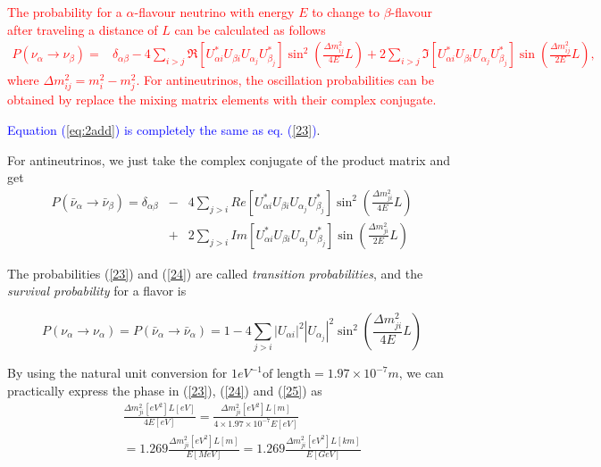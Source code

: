 \documentclass[a4 paper,12pt]{report}%
\begin{document}
\textcolor{red}{The probability for a $\alpha$-flavour neutrino with energy $E$ to change to $\beta$-flavour after traveling a distance of $L$ can be calculated as follows 
 \begin{align}\label{eq:2add}
 P(\nu_\alpha \rightarrow \nu_\beta) =& \delta_{\alpha \beta}-4\sum_{i>j}\Re\left[U^*_{\alpha i}U_{\beta i}U_{\alpha_j}U^*_{\beta_j}\right]\sin^2\left(\frac{\Delta m^2_{ij}}{4E}L\right) + 2\sum_{i>j}\Im\left[U^*_{\alpha i}U_{\beta i}U_{\alpha_j}U^*_{\beta_j}\right]\sin\left(\frac{\Delta m^2_{ij}}{2E}L\right),
 \end{align}
where $\Delta m^2_{ij} = m^2_{i} - m^2_{j}$. For antineutrinos, the oscillation probabilities can be obtained by replace the mixing matrix elements with their complex conjugate.}\par 
\textcolor{blue}{Equation (\ref{eq:2add}) is completely the same as eq. (\ref{23})}.\par 
For antineutrinos, we just take the complex conjugate of the product matrix and get
   \begin{eqnarray}\label{24}
 P(\bar\nu_\alpha \rightarrow \bar\nu_\beta) =\delta_{\alpha\beta}&-& 4\sum_{j>i}Re\left[U^*_{\alpha i}U_{\beta i}U_{\alpha_j}U^*_{\beta_j}\right]\sin^2(\frac{\Delta m^2_{ji}}{4E}L) \nonumber\\
&+& 2\sum_{j>i}Im\left[U^*_{\alpha i}U_{\beta i}U_{\alpha_j}U^*_{\beta_j}\right]\sin(\frac{\Delta m^2_{ji}}{2E}L)
   \end{eqnarray} \par
The probabilities (\ref{23}) and (\ref{24}) are called \textit{transition probabilities}, and the \textit{survival probability} for a flavor is
 
   \begin{equation}\label{25}
 P(\nu_\alpha \rightarrow \nu_\alpha) = P(\bar\nu_\alpha \rightarrow \bar\nu_\alpha) =1- 4\sum_{j>i}|U_{\alpha i}|^2|U_{\alpha_j}|^2\sin^2(\frac{\Delta m^2_{ji}}{4E}L)
   \end{equation} \par

By using the natural unit conversion for $1eV^{-1}\text{of length} = 1.97 \times 10^{-7}m$, we can practically express the phase in (\ref{23}), (\ref{24}) and (\ref{25}) as
   \begin{eqnarray}\label{26}
&& \frac{\Delta m^2_{ji}[eV^2] L[eV]}{4E[eV]} = \frac{\Delta m^2_{ji}[eV^2] L[m]}{4\times 1.97\times 10^{-7}E[eV]} \nonumber\\
&&=1.269 \frac{\Delta m^2_{ji}[eV^2] L[m]}{E[MeV]} = 1.269 \frac{\Delta m^2_{ji}[eV^2] L[km]}{E[GeV]}
   \end{eqnarray}
\end{document}
